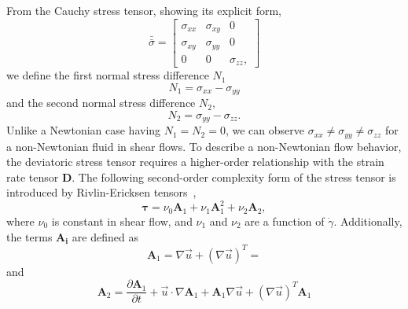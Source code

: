 \par
From the Cauchy stress tensor, showing its explicit form, 
\begin{equation}
  \bar{\bar{\sigma}} = 
  \begin{bmatrix}
    \sigma_{xx} & \sigma_{xy} & 0 
    \\
    \sigma_{xy} & \sigma_{yy} & 0 
    \\
    0 & 0 & \sigma_{zz},
  \end{bmatrix}
  \label{eq_cauchy_mx}
\end{equation} 
we define the first normal stress difference $N_1$
\begin{equation}
  N_1 = \sigma_{xx} - \sigma_{yy}
\end{equation}
and the second normal stress difference $N_2$,
\begin{equation}
  N_2 = \sigma_{yy} - \sigma_{zz}.
\end{equation}
Unlike a Newtonian case having $N_1 = N_2 = 0$, we can observe $\sigma_{xx} \neq \sigma_{yy} \neq \sigma_{zz}$ for a non-Newtonian fluid in shear flows.
To describe a non-Newtonian flow behavior, the deviatoric stress tensor requires a higher-order relationship with the strain rate tensor $\bm{D}$. The following second-order complexity form of the stress tensor is introduced by Rivlin-Ericksen tensors~\cite{rivlin_stress-deformation_1955},
\begin{equation}
   \boldsymbol{\tau} = 
    \nu_0  \bm{A}_1 +  \nu_1  \bm{A}_1^2 + \nu_2 \bm{A}_2,
   \label{eq_CN_tau}
\end{equation}
where $\nu_0$ is constant in shear flow, and $\nu_1$ and $\nu_2$ are a function of $\dot{\gamma}$.
Additionally, the terms $\bm{A_i}$ are defined as
\begin{equation}
   {\bm A_1}  = \nabla \vec{u} +  \left( \nabla \vec{u} \right)^T = 
\end{equation}
and 
\begin{equation}
   \boldsymbol{A}_2
   =\frac{\partial \boldsymbol{A}_1}{\partial t} + \vec{u} \cdot \nabla \boldsymbol{A}_1+\boldsymbol{A}_1 \nabla \vec{u}+ \left(\nabla \vec{u} \right)^T \boldsymbol{A}_1
\end{equation}
